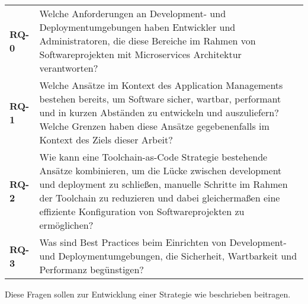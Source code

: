 \vspace{1em}
\begin{table}[H]
    \centering
    \begin{tabular}{p{} p{}}
        \textbf{RQ-0} & Welche Anforderungen an Development- und Deploymentumgebungen haben Entwickler und Administratoren, die diese Bereiche im Rahmen von Softwareprojekten mit Microservices Architektur verantworten? \\[2em]
        \textbf{RQ-1} & Welche Ansätze im Kontext des Application Managements bestehen bereits, um Software sicher, wartbar, performant und in kurzen Abständen zu entwickeln und auszuliefern? Welche Grenzen haben diese Ansätze gegebenenfalls im Kontext des Ziels dieser Arbeit? \\[2em]
        \textbf{RQ-2} & Wie kann eine Toolchain-as-Code Strategie bestehende Ansätze kombinieren, um die Lücke zwischen \Gls{development} und \Gls{deployment} zu schließen, manuelle Schritte im Rahmen der Toolchain zu reduzieren und dabei gleichermaßen eine effiziente Konfiguration von Softwareprojekten zu ermöglichen? \\[2em]
        \textbf{RQ-3} & Was sind Best Practices beim Einrichten von Development- und Deploymentumgebungen, die Sicherheit, Wartbarkeit und Performanz begünstigen? \\
    \end{tabular}
\end{table}
\vspace{1em}

Diese Fragen sollen zur Entwicklung einer Strategie wie beschrieben beitragen.
